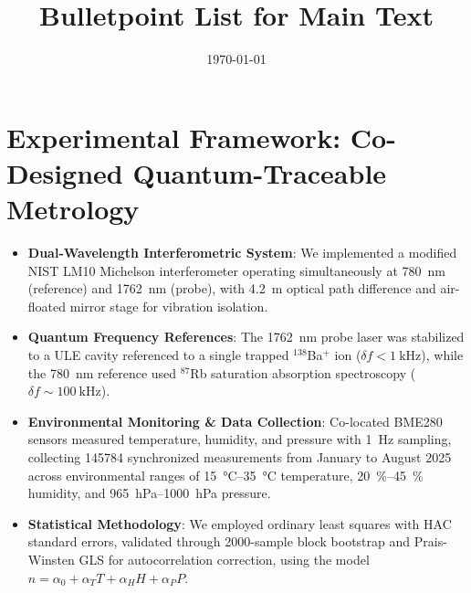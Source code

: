 \documentclass[aip,reprint,groupedaddress,onecolumn,superscriptaddress]{revtex4-2}
\begin{document}
\title{Bulletpoint List for Main Text}
\date{\today}

\maketitle

\section{Experimental Framework: Co-Designed Quantum-Traceable Metrology}
\begin{itemize}
    \item \textbf{Dual-Wavelength Interferometric System}: We implemented a modified NIST LM10 Michelson interferometer operating simultaneously at \SI{780}{\nano\meter} (reference) and \SI{1762}{\nano\meter} (probe), with \SI{4.2}{\meter} optical path difference and air-floated mirror stage for vibration isolation.
    
    \item \textbf{Quantum Frequency References}: The \SI{1762}{\nano\meter} probe laser was stabilized to a ULE cavity referenced to a single trapped $^{138}$Ba$^+$ ion ($\delta f < \SI{1}{\kilo\hertz}$), while the \SI{780}{\nano\meter} reference used $^{87}$Rb saturation absorption spectroscopy ($\delta f \sim \SI{100}{\kilo\hertz}$).
    
    \item \textbf{Environmental Monitoring \& Data Collection}: Co-located BME280 sensors measured temperature, humidity, and pressure with \SI{1}{\hertz} sampling, collecting \num{145784} synchronized measurements from January to August 2025 across environmental ranges of \SIrange{15}{35}{\degreeCelsius} temperature, \SIrange{20}{45}{\percent} humidity, and \SIrange{965}{1000}{\hecto\pascal} pressure.
    
    \item \textbf{Statistical Methodology}: We employed ordinary least squares with HAC standard errors, validated through \num{2000}-sample block bootstrap and Prais-Winsten GLS for autocorrelation correction, using the model $n = \alpha_0 + \alpha_T T + \alpha_H H + \alpha_P P$.
\end{itemize}
\end{document}
